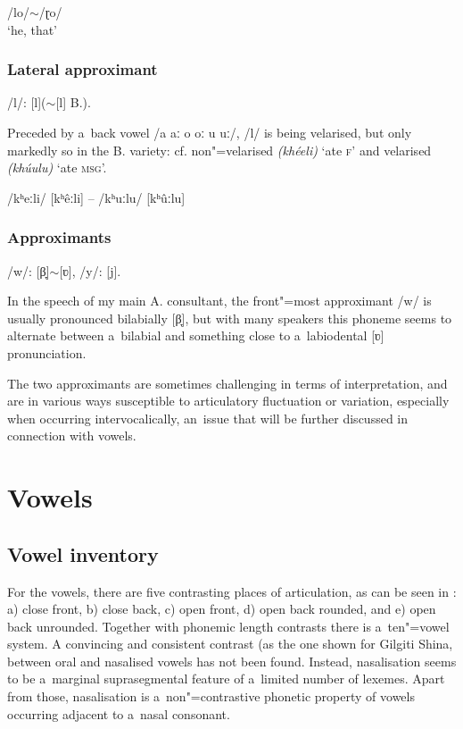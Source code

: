 \begin{exe}
\ex
\label{ex:3-5}
/lo/$\sim${}/ɽo/ \\
`he, that' 
\end{exe}

\subsubsection*{Lateral approximant}

/l/: [l]($\sim$[l] B.).


Preceded by a~back vowel /a aː o oː u uː/, /l/ is being velarised, but only markedly so in the B. variety: cf. non"=velarised \textit{(khéeli)} `ate \textsc{f}' and velarised \textit{(khúulu)} `ate \textsc{msg}'.

\begin{exe}
\ex
\label{ex:3-6}
/kʰeːli/ [kʰêːli] -- /kʰuːlu/ [kʰûːlu] 
\end{exe}

\subsubsection*{Approximants}

/w/: [β̞]$\sim$[ʋ], /y/: [j].


In the speech of my main A. consultant, the front"=most approximant /w/ is usually pronounced bilabially [β̞], but with many speakers this phoneme seems to alternate between a~bilabial and something close to a~labiodental [ʋ] pronunciation.


The two approximants are sometimes challenging in terms of interpretation, and are in various ways susceptible to articulatory fluctuation or variation, especially when occurring intervocalically, an~issue that will be further discussed in connection with vowels.


\section{Vowels}
\label{sec:3-2}

\subsection{Vowel inventory}

For the vowels, there are five contrasting places of articulation, as can be seen in : a) close front, b) close back, c) open front, d) open back rounded, and e) open back unrounded. Together with phonemic length contrasts there is a~ten"=vowel system. A convincing and consistent contrast (as the one shown for Gilgiti Shina, \citealt[19]{radloff1999} between oral and nasalised vowels has not been found. Instead, nasalisation seems to be a~marginal suprasegmental feature of a~limited number of lexemes. Apart from those, nasalisation is a~non"=contrastive phonetic property of vowels occurring adjacent to a~nasal consonant. 



